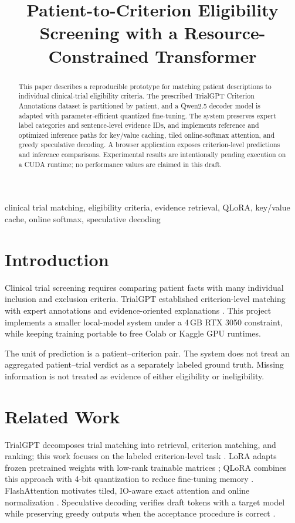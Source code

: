 \documentclass[conference]{IEEEtran}
\title{Patient-to-Criterion Eligibility Screening with a Resource-Constrained Transformer}
\author{\IEEEauthorblockN{Student Name}
\IEEEauthorblockA{Course: Generative AI\\
Institution: To be completed}}
\begin{document}
\maketitle

\begin{abstract}
This paper describes a reproducible prototype for matching patient descriptions to
individual clinical-trial eligibility criteria. The prescribed TrialGPT Criterion
Annotations dataset is partitioned by patient, and a Qwen2.5 decoder model is adapted
with parameter-efficient quantized fine-tuning. The system preserves expert label
categories and sentence-level evidence IDs, and implements reference and optimized
inference paths for key/value caching, tiled online-softmax attention, and greedy
speculative decoding. A browser application exposes criterion-level predictions and
inference comparisons. Experimental results are intentionally pending execution on a
CUDA runtime; no performance values are claimed in this draft.
\end{abstract}

\begin{IEEEkeywords}
clinical trial matching, eligibility criteria, evidence retrieval, QLoRA, key/value
cache, online softmax, speculative decoding
\end{IEEEkeywords}

\section{Introduction}
Clinical trial screening requires comparing patient facts with many individual
inclusion and exclusion criteria. TrialGPT established criterion-level matching with
expert annotations and evidence-oriented explanations \cite{jin2024trialgpt}. This
project implements a smaller local-model system under a 4\,GB RTX 3050 constraint,
while keeping training portable to free Colab or Kaggle GPU runtimes.

The unit of prediction is a patient--criterion pair. The system does not treat an
aggregated patient--trial verdict as a separately labeled ground truth. Missing
information is not treated as evidence of either eligibility or ineligibility.

\section{Related Work}
TrialGPT decomposes trial matching into retrieval, criterion matching, and ranking;
this work focuses on the labeled criterion-level task \cite{jin2024trialgpt}. LoRA
adapts frozen pretrained weights with low-rank trainable matrices
\cite{hu2022lora}; QLoRA combines this approach with 4-bit quantization to reduce
fine-tuning memory \cite{dettmers2023qlora}. FlashAttention motivates tiled,
IO-aware exact attention and online normalization \cite{dao2022flashattention}.
Speculative decoding verifies draft tokens with a target model while preserving
greedy outputs when the acceptance procedure is correct
\cite{leviathan2023speculative}.
\end{document}

